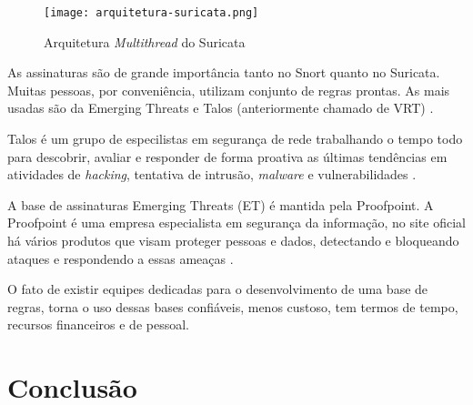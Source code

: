 \begin{figure}[htb]
  \centering
  \caption{Arquitetura \textit{Multithread} do Suricata} \label{fig_arquitetura-suricata}
  \texttt{[image: arquitetura-suricata.png]} 
\end{figure}

As assinaturas são de grande importância tanto no Snort quanto no Suricata. Muitas pessoas, por conveniência, utilizam conjunto de regras prontas. As mais usadas são da Emerging Threats e Talos (anteriormente chamado de VRT) \cite{suricata:rule}. 

Talos é um grupo de especilistas em segurança de rede trabalhando o tempo todo para descobrir, avaliar e responder de forma proativa as últimas tendências em atividades de \textit{hacking}, tentativa de intrusão, \textit{malware} e vulnerabilidades \cite{snort:talos}. 

A base de assinaturas Emerging Threats (ET) é mantida pela Proofpoint. A Proofpoint é uma empresa especialista em segurança da informação, no site oficial há vários produtos que visam proteger pessoas e dados, detectando e bloqueando ataques e respondendo a essas ameaças \cite{et:proofpoint}.

O fato de existir equipes dedicadas para o desenvolvimento de uma base de regras, torna o uso dessas bases confiáveis, menos custoso, tem termos de tempo, recursos financeiros e de pessoal.

\section{Conclusão} \label{sec:idps-conclusao}
